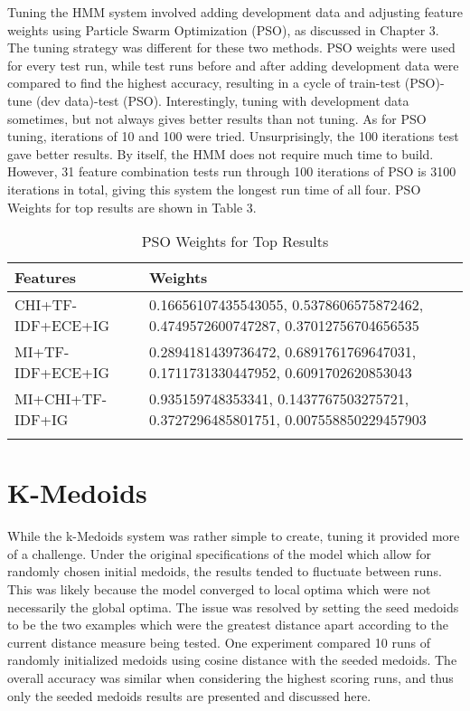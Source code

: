\documentclass [11pt, proquest] {uwthesis}[2020/02/24]
\begin{document}
Tuning the HMM system involved adding development data and adjusting feature weights using Particle Swarm Optimization (PSO), as discussed in Chapter 3. The tuning strategy was different for these two methods. PSO weights were used for every test run, while test runs before and after adding development data were compared to find the highest accuracy, resulting in a cycle of train-test (PSO)-tune (dev data)-test (PSO). Interestingly, tuning with development data sometimes, but not always gives better results than not tuning. As for PSO tuning, iterations of 10 and 100 were tried. Unsurprisingly, the 100 iterations test gave better results. By itself, the HMM does not require much time to build. However, 31 feature combination tests run through 100 iterations of PSO is 3100 iterations in total, giving this system the longest run time of all four. PSO Weights for top results are shown in Table 3.
\begin{longtable}{p{5cm}p{8cm}}
 Features&Weights\\
 \hline
CHI+TF-IDF+ECE+IG&0.16656107435543055, 0.5378606575872462, 0.4749572600747287, 0.37012756704656535\\
MI+TF-IDF+ECE+IG&0.2894181439736472, 0.6891761769647031, 0.1711731330447952, 0.6091702620853043\\
MI+CHI+TF-IDF+IG&0.935159748353341, 0.1437767503275721, 0.3727296485801751, 0.007558850229457903\\
\hline
\caption{PSO Weights for Top Results}
\end{longtable}
\section{K-Medoids}
While the k-Medoids system was rather simple to create, tuning it provided more of a challenge. Under the original specifications of the model which allow for randomly chosen initial medoids, the results tended to fluctuate between runs. This was likely because the model converged to local optima which were not necessarily the global optima. The issue was resolved by setting the seed medoids to be the two examples which were the greatest distance apart according to the current distance measure being tested. One experiment compared 10 runs of randomly initialized medoids using cosine distance with the seeded medoids. The overall accuracy was similar when considering the highest scoring runs, and thus only the seeded medoids results are presented and discussed here.
\end{document}
